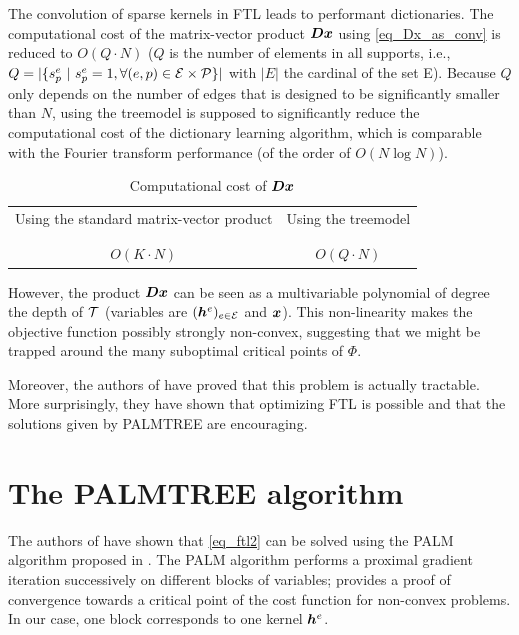 The convolution of sparse kernels in \ac{FTL} leads to performant dictionaries. The computational cost of the matrix-vector product $\bm{D}\bm{x}$ using \cref{eq_Dx_as_conv} is reduced to $O(Q \cdot N)$ ($Q$ is the number of elements in all supports, i.e., $Q=|\{s^e_p ~|~ s^e_p = 1, \forall (e,p) \in \mathcal E \times \mathcal P\}|$ with $|E|$ the cardinal of the set E). Because $Q$ only depends on the number of edges that is designed to be significantly smaller than  $N$, using the \gls{treemodel} is supposed to significantly reduce the computational cost of the dictionary learning algorithm, which is comparable with the Fourier transform performance (of the order of $O(N \log N)$).

\begin{table}[!ht] \centering 
\caption{Computational cost of $\bm{D}\bm{x}$}\label{table_comparison_Dx_costs}
\begin{tabular}{c|c}
Using the standard matrix-vector product & Using the \gls{treemodel} \\\\ \hline \\
$O(K \cdot N)$ & $O(Q \cdot N)$
\end{tabular}
\end{table}


\noindent
However, the product $\bm{D}\bm{x}$ can be seen as a multivariable polynomial of degree the depth of $\mathcal T$ (variables are $(\bm{h}^e)_{e \in \mathcal E}$ and $\bm{x}$). This non-linearity makes the objective function possibly strongly non-convex, suggesting that we might be trapped around the many suboptimal critical points of $\Phi$.

\noindent
Moreover, the authors of \cite{chabiron_optimization_2016} have proved that this problem is actually tractable. More surprisingly, they have shown that optimizing \ac{FTL} is possible and that the solutions given by \acs{PALMTREE} are encouraging.


\section{The PALMTREE algorithm}\label{sec_palmtree}

The authors of \cite{chabiron_optimization_2016} have shown that \eqref{eq_ftl2} can be solved using the \ac{PALM} algorithm proposed in \cite{bolte_proximal_2014}. The \ac{PALM} algorithm performs a proximal gradient iteration successively on different blocks of variables; \cite{bolte_proximal_2014} provides a proof of convergence towards a critical point of the cost function for non-convex problems. In our case, one block corresponds to one kernel $\bm{h}^e$.

